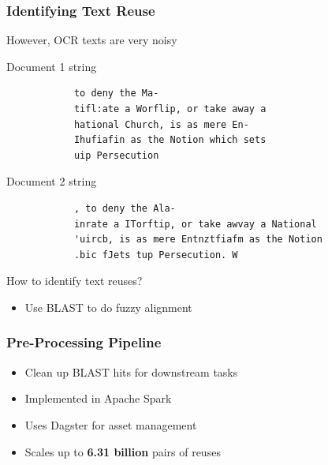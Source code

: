 \documentclass[pdf]{beamer}
\begin{document}
\begin{frame}[fragile]
    \frametitle{Identifying Text Reuse}


        However, OCR texts are very noisy
        \begin{block}{\centering Document 1 string}
            \footnotesize
            \begin{verbatim}
            to deny the Ma-
            tifl:ate a Worflip, or take away a
            hational Church, is as mere En-
            Ihufiafin as the Notion which sets
            uip Persecution    
            \end{verbatim}
        \end{block}    
        \begin{block}{\centering Document 2 string}
            \footnotesize
            \begin{verbatim}
            , to deny the Ala-
            inrate a ITorftip, or take awvay a National
            'uircb, is as mere Entnztfiafm as the Notion
            .bic fJets tup Persecution. W
            \end{verbatim}
        \end{block}    
        How to identify text reuses?
        \begin{itemize}
            \item Use BLAST to do fuzzy alignment
        \end{itemize}
\end{frame}

\begin{frame}[fragile]
    \frametitle{Pre-Processing Pipeline}
    \scalebox{0.5}{
    
    }
    \begin{itemize}
        \item Clean up BLAST hits for downstream tasks
        \item Implemented in Apache Spark 
        \item Uses Dagster for asset management
        \item Scales up to {\bf 6.31 billion} pairs of reuses
    \end{itemize}
\end{frame}
\end{document}
